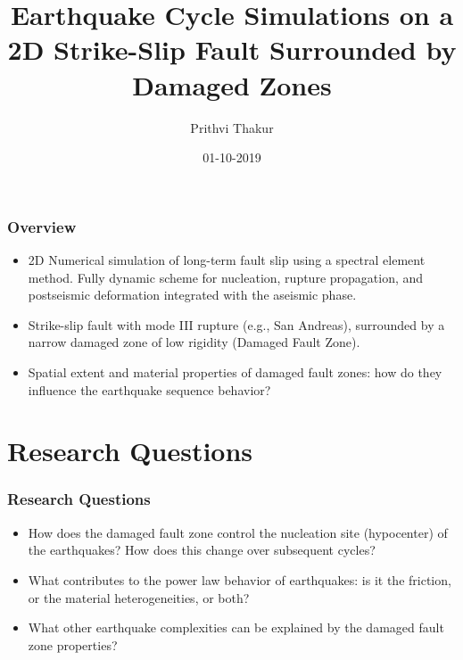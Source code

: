 \documentclass{beamer}
\title[EQ Cycles with DFZ]{Earthquake Cycle Simulations on a 2D Strike-Slip Fault Surrounded by Damaged Zones}
\author{Prithvi Thakur}
\institute[UofM]
{
\medskip
University of Michigan \\ %
\medskip
\textit{prith@umich.edu} %
}
\date{01-10-2019} %
\begin{document}
\begin{frame}
    \titlepage 
\end{frame}

\begin{frame}
    \frametitle{Overview}
    \begin{itemize}
        \item 2D Numerical simulation of long-term fault slip using a spectral element method. Fully dynamic scheme for nucleation, rupture propagation, and postseismic deformation integrated with the aseismic phase. 
        \item Strike-slip fault with mode III rupture (e.g., San Andreas), surrounded by a narrow damaged zone of low rigidity (Damaged Fault Zone).
        \item Spatial extent and material properties of damaged fault zones: how do they influence the earthquake sequence behavior?
    \end{itemize}
\end{frame}

\section{Research Questions}
\begin{frame}
    \frametitle{Research Questions}
    \begin{itemize}
        \item How does the damaged fault zone control the nucleation site (hypocenter) of the earthquakes? How does this change over subsequent cycles?
        \item What contributes to the power law behavior of earthquakes: is it the friction, or the material heterogeneities, or both?
        \item What other earthquake complexities can be explained by the damaged fault zone properties?
    \end{itemize}
\end{frame}

\end{document}
